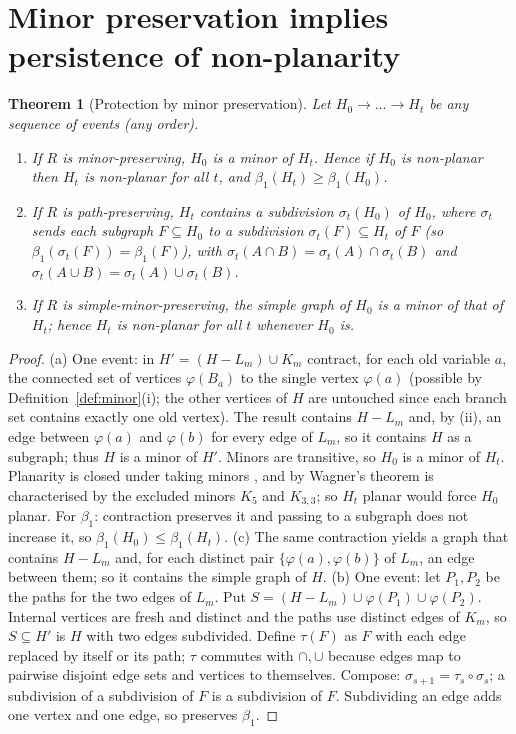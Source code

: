\documentclass[10pt]{article}
\theoremstyle{definition}
\theoremstyle{plain}
\newtheorem{theorem}{Theorem}
\theoremstyle{remark}
\newcommand{\Betti}{\beta_1}
\begin{document}
\section{Minor preservation implies persistence of non-planarity}
\begin{theorem}[Protection by minor preservation]\label{thm:protect}
Let $H_0\to\dots\to H_t$ be any sequence of events (any order).
\begin{enumerate}
\item[(a)] If $R$ is minor-preserving, $H_0$ is a minor of $H_t$. Hence if $H_0$ is non-planar then $H_t$ is non-planar for all $t$, and $\Betti(H_t)\ge\Betti(H_0)$.
\item[(b)] If $R$ is path-preserving, $H_t$ contains a subdivision $\sigma_t(H_0)$ of $H_0$, where $\sigma_t$ sends each subgraph $F\subseteq H_0$ to a subdivision $\sigma_t(F)\subseteq H_t$ of $F$ (so $\Betti(\sigma_t(F))=\Betti(F)$), with $\sigma_t(A\cap B)=\sigma_t(A)\cap\sigma_t(B)$ and $\sigma_t(A\cup B)=\sigma_t(A)\cup\sigma_t(B)$.
\item[(c)] If $R$ is simple-minor-preserving, the simple graph of $H_0$ is a minor of that of $H_t$; hence $H_t$ is non-planar for all $t$ whenever $H_0$ is.
\end{enumerate}
\end{theorem}
\begin{proof}
(a) One event: in $H'=(H-L_m)\cup K_m$ contract, for each old variable $a$, the connected set of vertices $\varphi(B_a)$ to the single vertex $\varphi(a)$ (possible by Definition~\ref{def:minor}(i); the other vertices of $H$ are untouched since each branch set contains exactly one old vertex). The result contains $H-L_m$ and, by (ii), an edge between $\varphi(a)$ and $\varphi(b)$ for every edge of $L_m$, so it contains $H$ as a subgraph; thus $H$ is a minor of $H'$. Minors are transitive, so $H_0$ is a minor of $H_t$. Planarity is closed under taking minors \citep{diestel2017}, and by Wagner's theorem \citep{wagner1937} is characterised by the excluded minors $K_5$ and $K_{3,3}$; so $H_t$ planar would force $H_0$ planar. For $\Betti$: contraction preserves it and passing to a subgraph does not increase it, so $\Betti(H_0)\le\Betti(H_t)$.
(c) The same contraction yields a graph that contains $H-L_m$ and, for each distinct pair $\{\varphi(a),\varphi(b)\}$ of $L_m$, an edge between them; so it contains the simple graph of $H$.
(b) One event: let $P_1,P_2$ be the paths for the two edges of $L_m$. Put $S=(H-L_m)\cup\varphi(P_1)\cup\varphi(P_2)$. Internal vertices are fresh and distinct and the paths use distinct edges of $K_m$, so $S\subseteq H'$ is $H$ with two edges subdivided. Define $\tau(F)$ as $F$ with each edge replaced by itself or its path; $\tau$ commutes with $\cap,\cup$ because edges map to pairwise disjoint edge sets and vertices to themselves. Compose: $\sigma_{s+1}=\tau_s\circ\sigma_s$; a subdivision of a subdivision of $F$ is a subdivision of $F$. Subdividing an edge adds one vertex and one edge, so preserves $\Betti$.
\end{proof}
\end{document}
